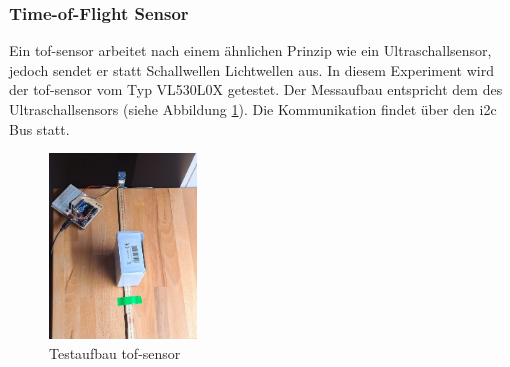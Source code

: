 \documentclass[../main.tex]{subfiles}
\begin{document}
\newpage
\subsubsection{Time-of-Flight Sensor}
Ein \acrfull{tof-sensor} arbeitet nach einem ähnlichen Prinzip wie ein Ultraschallsensor, jedoch sendet er statt Schallwellen Lichtwellen aus. In diesem Experiment wird der \acrshort{tof-sensor} vom Typ VL530L0X getestet. Der Messaufbau entspricht dem des Ultraschallsensors (siehe Abbildung \ref{fig:TOF1}). Die Kommunikation findet über den \gls{i2c} Bus statt.

\begin{figure}[h!] %
    \centering
    \includegraphics[width=0.35\textwidth]{img/sensortest/MA_TOF.jpg} %
    \caption{Testaufbau \acrshort{tof-sensor}}
    \label{fig:TOF1} %
\end{figure}
\end{document}
